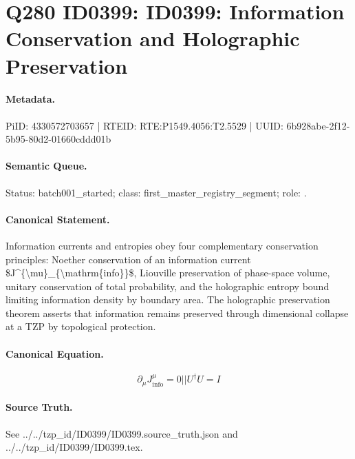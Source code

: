 \section*{Q280 ID0399: ID0399: Information Conservation and Holographic Preservation}
\paragraph{Metadata.}
PiID: 4330572703657 | RTEID: RTE:P1549.4056:T2.5529 | UUID: 6b928abe-2f12-5b95-80d2-01660cddd01b

\paragraph{Semantic Queue.}
Status: batch001\_started; class: first\_master\_registry\_segment; role: .

\paragraph{Canonical Statement.}
Information currents and entropies obey four complementary conservation principles: Noether conservation of an information current \$J\textasciicircum{}\{\textbackslash{}mu\}\_\{\textbackslash{}mathrm\{info\}\}\$, Liouville preservation of phase-space volume, unitary conservation of total probability, and the holographic entropy bound limiting information density by boundary area. The holographic preservation theorem asserts that information remains preserved through dimensional collapse at a TZP by topological protection.

\paragraph{Canonical Equation.}
\[
\partial_{\mu}J^{\mu}_{\mathrm{info}}=0 || U^{\dagger}U=I
\]

\paragraph{Source Truth.}
See ../../tzp\_id/ID0399/ID0399.source\_truth.json and ../../tzp\_id/ID0399/ID0399.tex.
